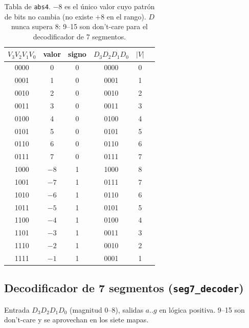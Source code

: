 \documentclass[11pt,a4paper]{article}
\newcommand{\sig}[1]{\texttt{#1}}
\begin{document}
\begin{table}[H]
\centering\small
\begin{tabular}{@{}cccc|c|c@{}}
\toprule
$V_3V_2V_1V_0$ & valor & signo & $D_3D_2D_1D_0$ & $|V|$ \\
\midrule
0000 & 0 & 0 & 0000 & 0\\ 0001 & 1 & 0 & 0001 & 1\\ 0010 & 2 & 0 & 0010 & 2\\ 0011 & 3 & 0 & 0011 & 3\\
0100 & 4 & 0 & 0100 & 4\\ 0101 & 5 & 0 & 0101 & 5\\ 0110 & 6 & 0 & 0110 & 6\\ 0111 & 7 & 0 & 0111 & 7\\
1000 & $-8$ & 1 & 1000 & 8\\ 1001 & $-7$ & 1 & 0111 & 7\\ 1010 & $-6$ & 1 & 0110 & 6\\ 1011 & $-5$ & 1 & 0101 & 5\\
1100 & $-4$ & 1 & 0100 & 4\\ 1101 & $-3$ & 1 & 0011 & 3\\ 1110 & $-2$ & 1 & 0010 & 2\\ 1111 & $-1$ & 1 & 0001 & 1\\
\bottomrule
\end{tabular}
\caption{Tabla de \sig{abs4}. $-8$ es el único valor cuyo patrón de bits no cambia (no existe $+8$ en el rango). $D$ nunca supera 8: 9--15 son don't-care para el decodificador de 7 segmentos.}
\end{table}

\subsection{Decodificador de 7 segmentos (\sig{seg7\_decoder})}

Entrada $D_3D_2D_1D_0$ (magnitud 0--8), salidas $a..g$ en lógica positiva. 9--15 son don't-care y se aprovechan en los siete mapas.
\end{document}
